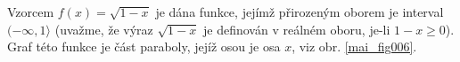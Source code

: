 \wikitextrule
\begin{example}\label{MAI:exam018} 
  Vzorcem $f(x)=\sqrt{1-x}$ je dána funkce, jejímž přirozeným oborem je interval 
  $(-\infty,1\rangle$ (uvažme, že výraz $\sqrt{1-x}$ je definován v reálném oboru, je-li 
  $1-x\geq0$). Graf této funkce je část paraboly, jejíž osou je osa $x$, viz obr. 
  \ref{mai_fig006}.
  
  {\centering
   \captionsetup{type=figure}
   
   \label{mai_fig006}
   \par}

\end{example}
